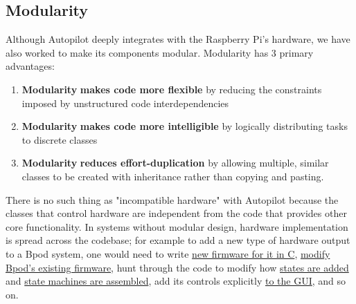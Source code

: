 \subsection{Modularity}

Although Autopilot deeply integrates with the Raspberry Pi's hardware, we have also worked to make its components modular. Modularity has 3 primary advantages:
\begin{enumerate}
    \item \textbf{Modularity} \textbf{makes code more flexible} by reducing the constraints imposed by unstructured code interdependencies
    \item \textbf{Modularity} \textbf{makes code more intelligible} by logically distributing tasks to discrete classes
    \item \textbf{Modularity} \textbf{reduces effort-duplication} by allowing multiple, similar classes to be created with inheritance rather than copying and pasting.
\end{enumerate}

There is no such thing as "incompatible hardware" with Autopilot because the classes that control hardware are independent from the code that provides other core functionality. In systems without modular design, hardware implementation is spread across the codebase; for example to add a new type of hardware output to a Bpod system, one would need to write \href{https://github.com/sanworks/Bpod_Gen2/blob/master/FIRMWARE\%20README.txt}{new firmware for it in C}, \href{https://github.com/sanworks/Bpod_StateMachine_Firmware/blob/v22/Preconfigured/StateMachine-Bpod2_0/StateMachine-Bpod2_0.ino}{modify Bpod's existing firmware}, hunt through the code to modify how \href{https://github.com/sanworks/Bpod_Gen2/blob/71f3a256b68926b65eae71e10fd747bd28e7ba7d/Functions/State\%20Machine\%20Assembler/AddState.m#L170}{states are added} and \href{https://github.com/sanworks/Bpod_Gen2/blob/71f3a256b68926b65eae71e10fd747bd28e7ba7d/Functions/\%40BpodObject/SetupStateMachine.m#L123}{state machines are assembled}, add its controls explicitly \href{https://github.com/sanworks/Bpod_Gen2/blob/71f3a256b68926b65eae71e10fd747bd28e7ba7d/Functions/Override\%20Panels/StateMachinePanel_2_0_0.m}{to the GUI}, and so on. 

